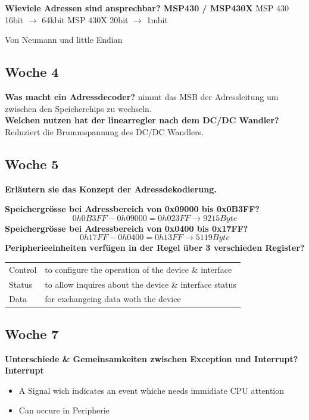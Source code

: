 \textbf{Wieviele Adressen sind ansprechbar? MSP430 / MSP430X}\newline
    MSP 430  \qquad 16bit $ \rightarrow $ 64kbit \newline
    MSP 430X \quad 20bit $ \rightarrow $ 1mbit \newline
    
    Von Neumann und little Endian
    
\subsection*{Woche 4}
\textbf{Was macht ein Adressdecoder?}\newline
    nimmt das MSB der Adressleitung um zwischen den Speicherchips zu wechseln.\\
    
\textbf{Welchen nutzen hat der linearregler nach dem DC/DC Wandler?}\newline
    Reduziert die Brummspannung des DC/DC Wandlers.
    
\subsection*{Woche 5}
\textbf{Erläutern sie das Konzept der Adressdekodierung.}\newline
    
\textbf{Speichergrösse bei Adressbereich von 0x09000 bis 0x0B3FF?}\newline
\[ 0h0B3FF - 0h09000 = 0h023FF \rightarrow 9215Byte \]
\textbf{Speichergrösse bei Adressbereich von 0x0400 bis 0x17FF?}\newline
\[ 0h17FF - 0h0400 = 0h13FF \rightarrow 5119Byte \]
\textbf{Peripherieeinheiten verfügen in der Regel über  3 verschieden Register?}\newline
\begin{tabular}{ll}
    Control & to configure the operation of the device \& interface\\
    Status  & to allow inquires about the device \& interface status\\
    Data    & for exchangeing data woth the device
\end{tabular}

\subsection*{Woche 7}
\textbf{Unterschiede \& Gemeinsamkeiten zwischen Exception und Interrupt?}\newline
    \null\qquad \textbf{Interrupt}
    \begin{itemize}
        \item A Signal wich indicates an event whiche needs immidiate CPU attention
        \item Can occure in Peripherie
    \end{itemize}
    
